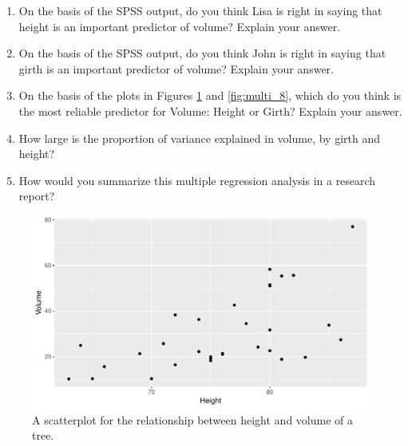 \documentclass[]{book}\usepackage[]{graphicx}\usepackage[]{color}
\makeatletter
\def\maxwidth{ %
  \ifdim\Gin@nat@width>\linewidth
    \linewidth
  \else
    \Gin@nat@width
  \fi
}
\newenvironment{knitrout}{}{} %
\makeatother
\begin{document}
\begin{enumerate}
\item On the basis of the SPSS output, do you think Lisa is right in saying that height is an important predictor of volume? Explain your answer.

\item On the basis of the SPSS output, do you think John is right in saying that girth is an important predictor of volume? Explain your answer.

\item On the basis of the plots in Figures \ref{fig:multi_7} and \ref{fig:multi_8}, which do you think is the most reliable predictor for Volume: Height or Girth? Explain your answer.

\item How large is the proportion of variance explained in volume, by girth and height?

\item How would you summarize this multiple regression analysis in a research report?

\end{enumerate}

\begin{knitrout}
\color{fgcolor}\begin{figure}

{\centering \includegraphics[width=\maxwidth]{figure/multi_7-1} 

}

\caption[A scatterplot for the relationship between height and volume of a tree]{A scatterplot for the relationship between height and volume of a tree.}\label{fig:multi_7}
\end{figure}


\end{knitrout}
\end{document}
